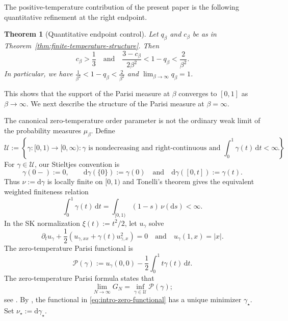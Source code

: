 \documentclass[10pt]{amsart}
\newtheorem{theorem}{Theorem}[section]
\theoremstyle{definition}
\theoremstyle{remark}
\numberwithin{equation}{section}
\newcommand{\1}{\mathbf 1}
\newcommand{\cU}{\mathcal U}
\newcommand{\cP}{\mathcal P}
\newcommand{\dd}{\,\mathrm d}
\begin{document}
The positive-temperature contribution of the present paper is the following quantitative refinement at the right endpoint.

\begin{theorem}[Quantitative endpoint control]
\label{thm:finite-temperature}
Let $q_\beta$ and $c_\beta$ be as in Theorem~\ref{thm:finite-temperature-structure}.  Then
\begin{equation}
 c_\beta>\frac13
 \quad\text{and}\quad
 \frac{3-c_\beta}{2\beta^2}<1-q_\beta<\frac2{\beta^2}.
 \label{eq:intro-finite-endpoint-bounds}
\end{equation}
In particular, we have $\frac1{\beta^2}<1-q_\beta<\frac2{\beta^2}$ and $\lim_{\beta\to\infty}q_\beta=1$.
\end{theorem}

This shows that the support of the Parisi measure at $\beta$ converges to $[0,1]$ as $\beta\to\infty$. We next describe the structure of the Parisi measure at $\beta=\infty$.

The canonical zero-temperature order parameter is not the ordinary weak limit of the probability measures $\mu_\beta$. Define
\begin{equation}
 \cU:=\left\{\gamma:[0,1)\to[0,\infty):\gamma\text{ is nondecreasing and right-continuous and }\int_0^1\gamma(t)\dd t<\infty\right\}.
 \label{eq:intro-zero-class}
\end{equation}
For $\gamma\in\cU$, our Stieltjes convention is
\begin{equation*}
 \gamma(0-):=0,
 \qquad
 \mathrm d\gamma(\{0\}):=\gamma(0)
 \quad\text{and}\quad
 \mathrm d\gamma([0,t]):=\gamma(t).
\end{equation*}
Thus $\nu:=\mathrm d\gamma$ is locally finite on $[0,1)$ and Tonelli's theorem gives the equivalent weighted finiteness relation
\begin{equation*}
 \int_0^1\gamma(t)\dd t
 =\int_{[0,1)}(1-s)\,\nu(\mathrm d s)<\infty.
\end{equation*}
In the SK normalization $\xi(t):=t^2/2$, let $u_\gamma$ solve
\begin{equation}
 \partial_tu_\gamma+\frac12\left(u_{\gamma,xx}+\gamma(t)u_{\gamma,x}^2\right)=0
 \quad\text{and}\quad
 u_\gamma(1,x)=|x|.
 \label{eq:intro-zero-PDE}
\end{equation}
The zero-temperature Parisi functional is
\begin{equation}
 \cP(\gamma):=u_\gamma(0,0)-\frac12\int_0^1t\gamma(t)\dd t.
\label{eq:intro-zero-functional}
\end{equation}
The zero-temperature Parisi formula states that
\begin{equation*}
 \lim_{N\to\infty}G_N
 =\inf_{\gamma\in\cU}\cP(\gamma);
\end{equation*}
see \cite[Theorem 1]{AuffingerChenGroundState}. By \cite[Theorem 4]{ChenHandschyLerman}, the functional in \eqref{eq:intro-zero-functional} has a unique minimizer $\gamma_\star$. Set $\nu_\star:=\mathrm d\gamma_\star$.
\end{document}
